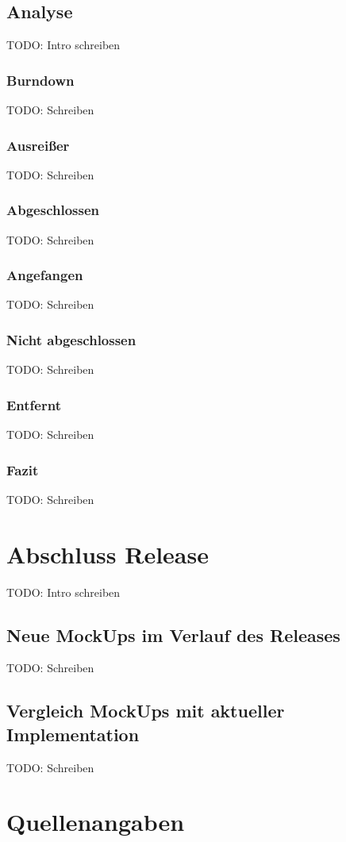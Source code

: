 \documentclass[12pt, titlepage]{scrartcl}
\newcommand{\RN}[1]{%
	\textup{\uppercase\expandafter{\romannumeral#1}}%
}
\begin{document}
    	\subsection{Analyse}
    		TODO: Intro schreiben
	    	\subsubsection{Burndown}
	    		TODO: Schreiben
	    	\subsubsection{Ausrei{\ss}er}
	    		TODO: Schreiben
	    	\subsubsection{Abgeschlossen}
	    		TODO: Schreiben
	    		\subsubsection{Angefangen}
	    		TODO: Schreiben
	    	\subsubsection{Nicht abgeschlossen}
	    		TODO: Schreiben
	    	\subsubsection{Entfernt}
	    		TODO: Schreiben
	    	\subsubsection{Fazit}
	    		TODO: Schreiben
	\newpage
	\section{Abschluss Release \RN{3}}
		TODO: Intro schreiben
		\subsection{Neue MockUps im Verlauf des Releases \RN{3}}
		TODO: Schreiben
		\subsection{Vergleich MockUps mit aktueller Implementation}
		TODO: Schreiben
	\newpage
	\section{Quellenangaben}
		\listoffigures
		\listoftables
\end{document}
